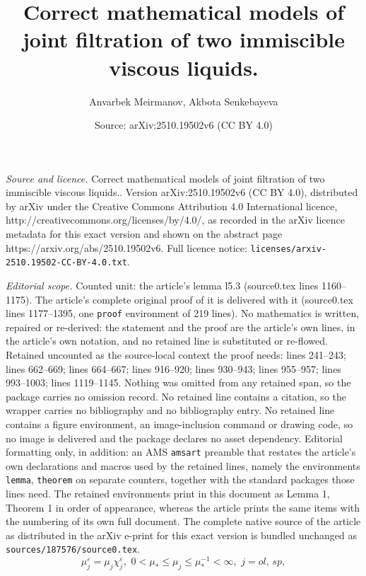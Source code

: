 \documentclass[10pt,a4paper]{amsart}
\title{Correct mathematical models of joint filtration of two immiscible viscous liquids.}
\author{Anvarbek Meirmanov, Akbota Senkebayeva}
\date{Source: arXiv:2510.19502v6 (CC BY 4.0)}
\begin{document}
\maketitle

\noindent\emph{Source and licence.} Correct mathematical models of joint filtration of two immiscible viscous liquids.. Version arXiv:2510.19502v6 (CC BY 4.0), distributed by arXiv under the Creative Commons Attribution 4.0 International licence, http://creativecommons.org/licenses/by/4.0/, as recorded in the arXiv licence metadata for this exact version and shown on the abstract page https://arxiv.org/abs/2510.19502v6. Full licence notice: \texttt{licenses/arxiv-2510.19502-CC-BY-4.0.txt}.\par\smallskip

\noindent\textit{Editorial scope.} Counted unit: the article's lemma l5.3 (source0.tex lines 1160--1175). The article's complete original proof of it is delivered with it (source0.tex lines 1177--1395, one \texttt{proof} environment of 219 lines). No mathematics is written, repaired or re-derived: the statement and the proof are the article's own lines, in the article's own notation, and no retained line is substituted or re-flowed.  Retained uncounted as the source-local context the proof needs: lines 241--243; lines 662--669; lines 664--667; lines 916--920; lines 930--943; lines 955--957; lines 993--1003; lines 1119--1145.  Nothing was omitted from any retained span, so the package carries no omission record.  No retained line contains a citation, so the wrapper carries no bibliography and no bibliography entry.  No retained line contains a figure environment, an image-inclusion command or drawing code, so no image is delivered and the package declares no asset dependency.  Editorial formatting only, in addition: an AMS \texttt{amsart} preamble that restates the article's own declarations and macros used by the retained lines, namely the environments \texttt{lemma}, \texttt{theorem} on separate counters, together with the standard packages those lines need.  The retained environments print in this document as Lemma 1, Theorem 1 in order of appearance, whereas the article prints the same items with the numbering of its own full document.  The complete native source of the article as distributed in the arXiv e-print for this exact version is bundled unchanged as \texttt{sources/187576/source0.tex}.
\begin{equation}\label{eq2.1}
\mu^{\varepsilon}_{j}=\mu_{j}\chi^{\varepsilon}_{j},\,\, 0<\mu_{*}\leqslant\mu_{j}\leqslant\mu_{*}^{-1}<\infty,\,\,j=ol,\,sp,
\end{equation}
\end{document}
